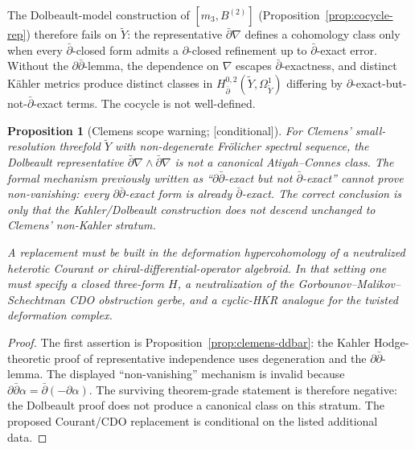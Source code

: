 \documentclass[11pt,reqno]{amsart}
\theoremstyle{plain}
\newtheorem{proposition}[theorem]{Proposition}
\theoremstyle{definition}
\theoremstyle{remark}
\providecommand{\ClaimStatusConditional}{\textnormal{[conditional]}}
\begin{document}
The Dolbeault-model construction of $[m_3, B^{(2)}]$ (Proposition~\ref{prop:cocycle-rep}) therefore fails on $\tilde Y$: the representative $\bar\partial \nabla$ defines a cohomology class only when every $\bar\partial$-closed form admits a $\partial$-closed refinement up to $\bar\partial$-exact error. Without the $\partial\bar\partial$-lemma, the dependence on $\nabla$ escapes $\bar\partial$-exactness, and distinct Kähler metrics produce distinct classes in $H^{0,2}_{\bar\partial}(\tilde Y, \Omega^1_{\tilde Y})$ differing by $\partial$-exact-but-not-$\bar\partial$-exact terms. The cocycle is not well-defined.

\begin{proposition}[Clemens scope warning; \ClaimStatusConditional]
\label{prop:clemens-explicit}
For Clemens' small-resolution threefold $\tilde Y$ with non-degenerate
Fr\"olicher spectral sequence, the Dolbeault representative
$\bar\partial\nabla\wedge\bar\partial\nabla$ is not a canonical
Atiyah--Connes class. The formal mechanism previously written as
``$\partial\bar\partial$-exact but not $\bar\partial$-exact'' cannot
prove non-vanishing: every $\partial\bar\partial$-exact form is already
$\bar\partial$-exact. The correct conclusion is only that the
Kahler/Dolbeault construction does not descend unchanged to Clemens'
non-Kahler stratum.

A replacement must be built in the deformation hypercohomology of a
neutralized heterotic Courant or chiral-differential-operator
algebroid. In that setting one must specify a closed three-form $H$,
a neutralization of the Gorbounov--Malikov--Schechtman CDO obstruction
gerbe, and a cyclic-HKR analogue for the twisted deformation complex.
\end{proposition}

\begin{proof}
The first assertion is Proposition~\ref{prop:clemens-ddbar}: the
Kahler Hodge-theoretic proof of representative independence uses
degeneration and the $\partial\bar\partial$-lemma. The displayed
``non-vanishing'' mechanism is invalid because
$\partial\bar\partial\alpha=\bar\partial(-\partial\alpha)$. The
surviving theorem-grade statement is therefore negative: the
Dolbeault proof does not produce a canonical class on this stratum.
The proposed Courant/CDO replacement is conditional on the listed
additional data.
\end{proof}
\end{document}
